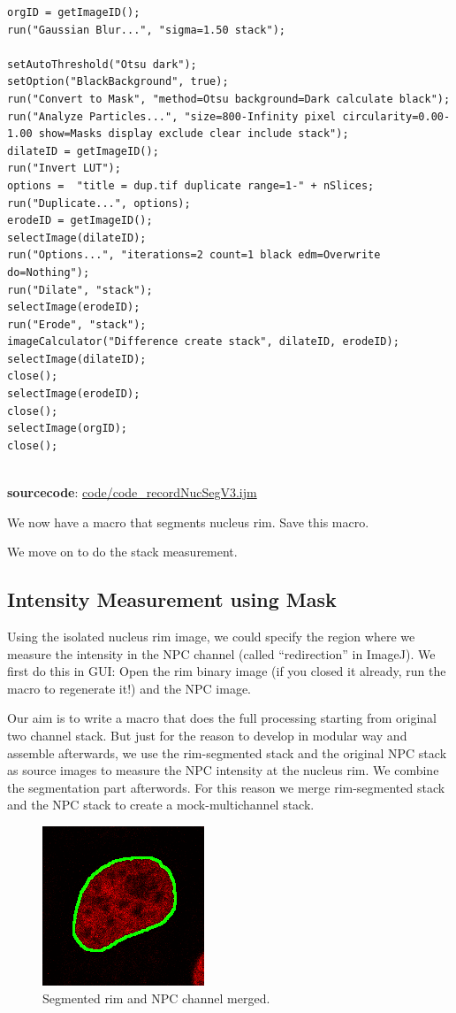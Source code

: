 \documentclass[11pt,a4paper,oneside]{report}
\begin{document}
\begin{lstlisting}
orgID = getImageID();
run("Gaussian Blur...", "sigma=1.50 stack");

setAutoThreshold("Otsu dark");
setOption("BlackBackground", true);
run("Convert to Mask", "method=Otsu background=Dark calculate black");
run("Analyze Particles...", "size=800-Infinity pixel circularity=0.00-1.00 show=Masks display exclude clear include stack");
dilateID = getImageID();
run("Invert LUT");
options =  "title = dup.tif duplicate range=1-" + nSlices;
run("Duplicate...", options);
erodeID = getImageID();
selectImage(dilateID);
run("Options...", "iterations=2 count=1 black edm=Overwrite do=Nothing");
run("Dilate", "stack");
selectImage(erodeID);
run("Erode", "stack");
imageCalculator("Difference create stack", dilateID, erodeID);
selectImage(dilateID);
close();
selectImage(erodeID);
close();
selectImage(orgID);
close();


\end{lstlisting}
\textbf{sourcecode}: \href{http://www.example.com/contents}{code/code\_recordNucSegV3.ijm}

We now have a macro that segments nucleus rim. Save this macro.

We move on to do the stack measurement. 

\subsection{Intensity Measurement using Mask}

Using the isolated nucleus rim image, we could specify the region where we measure the intensity in the NPC channel (called ``redirection'' in ImageJ). We first do this in GUI: Open the rim binary image (if you closed it already, run the macro to regenerate it!) and the NPC image. 

Our aim is to write a macro that does the full processing starting from original two channel stack. But just for the reason to develop in modular way and assemble afterwards, we use the rim-segmented stack and the original NPC stack as source images to measure the NPC intensity at the nucleus rim. We combine the segmentation part afterwords. For this reason we merge rim-segmented stack and the NPC stack to create a mock-multichannel stack.  

\begin{figure}[h!]
\begin{center}
\includegraphics[scale=1.0]{fig/NucRimMerged.png}
\caption{Segmented rim and NPC channel merged.}
\label{fig:NucRimMerged}
\end{center}
\end{figure}
\end{document}
